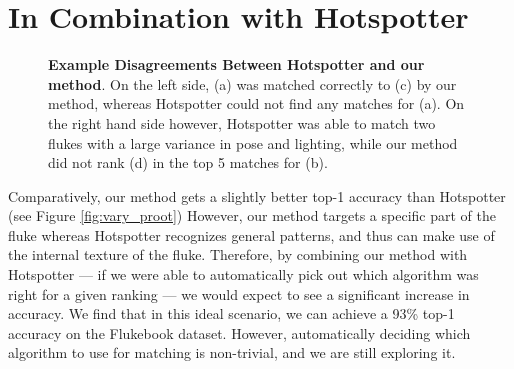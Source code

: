 



\section{In Combination with Hotspotter}

\begin{figure}[t]%
\centering
{}
\newline
{}
\caption{\textbf{Example Disagreements Between Hotspotter and our method}. On the left side, (a) was matched correctly to (c) by our method, whereas Hotspotter could not find any matches for (a). On the right hand side however, Hotspotter was able to match two flukes with a large variance in pose and lighting, while our method did not rank (d) in the top 5 matches for (b).}
\label{fig:dis_proot}
\end{figure}



Comparatively, our method gets a slightly better top-1 accuracy than Hotspotter (see Figure \ref{fig:vary_proot})
However, our method targets a specific part of the fluke whereas Hotspotter recognizes general patterns, and thus can make use of the internal texture of the fluke.
Therefore, by combining our method with Hotspotter --- if we were able to automatically pick out which algorithm was right for a given ranking --- we would expect to see a significant increase in accuracy.
We find that in this ideal scenario, we can achieve a 93\% top-1 accuracy on the Flukebook dataset.
However, automatically deciding which algorithm to use for matching is non-trivial, and we are still exploring it.

